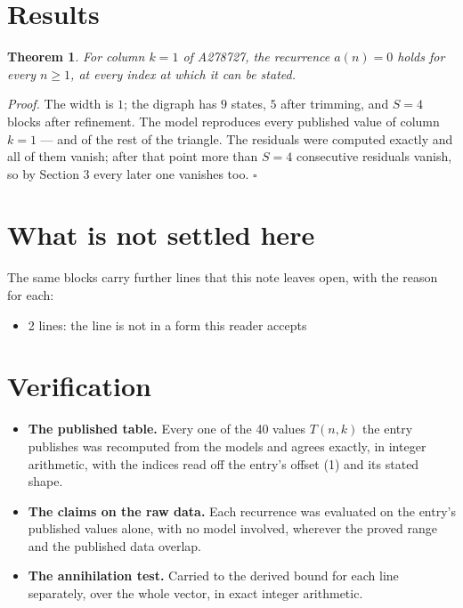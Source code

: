\documentclass[11pt]{article}
\newtheorem{theorem}{Theorem}
\theoremstyle{definition}
\begin{document}
\section{Results}

\begin{theorem} For column $k = 1$ of A278727, the recurrence $a(n) = 0$ holds for every $n \ge 1$, at every index at which it can be stated.\end{theorem}

{\itshape Proof.} The width is $1$; the digraph has $9$ states, $5$ after trimming, and $S = 4$ blocks after refinement. The model reproduces every published value of column $k = 1$ --- and of the rest of the triangle. The residuals were computed exactly and all of them vanish; after that point more than $S = 4$ consecutive residuals vanish, so by Section 3 every later one vanishes too. $\square$

\section{What is not settled here}

The same blocks carry further lines that this note leaves open, with the reason for each:

\begin{itemize}

\item 2 lines: the line is not in a form this reader accepts

\end{itemize}

\section{Verification}

\begin{itemize}

\item {\bfseries The published table.} Every one of the 40 values $T(n,k)$ the entry publishes was recomputed from the models and agrees exactly, in integer arithmetic, with the indices read off the entry's offset (1) and its stated shape.

\item {\bfseries The claims on the raw data.} Each recurrence was evaluated on the entry's published values alone, with no model involved, wherever the proved range and the published data overlap.

\item {\bfseries The annihilation test.} Carried to the derived bound for each line separately, over the whole vector, in exact integer arithmetic.

\end{itemize}
\end{document}
